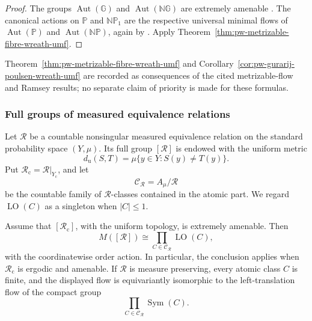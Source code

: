 \begin{proof}
The groups \(\operatorname{Aut}(\mathbb G)\) and
\(\operatorname{Aut}(\mathbb{NG})\) are extremely amenable
\cite{BartosovaLopezAbadLupiniMbombo2022,BartosovaLopezAbadLupiniMbombo2021}.  The canonical actions on \(\mathbb P\) and
\(\mathbb{NP}_1\) are the respective universal minimal flows of
\(\operatorname{Aut}(\mathbb P)\) and \(\operatorname{Aut}(\mathbb{NP})\),
again by \cite{BartosovaLopezAbadLupiniMbombo2022,BartosovaLopezAbadLupiniMbombo2021}.  Apply
Theorem~\ref{thm:pw-metrizable-fibre-wreath-umf}.
\end{proof}

Theorem~\ref{thm:pw-metrizable-fibre-wreath-umf} and
Corollary~\ref{cor:pw-gurarij-poulsen-wreath-umf} are recorded as consequences of
the cited metrizable-flow and Ramsey results; no separate claim of priority is
made for these formulas.


\subsubsection{Full groups of measured equivalence relations}

Let \(\mathcal R\) be a countable nonsingular measured equivalence relation on
the standard probability space \((Y,\mu)\). Its full group \([\mathcal R]\)
is endowed with the uniform metric
\[
 d_{\mathrm u}(S,T)=\mu\{y\in Y:S(y)\ne T(y)\}.
\]
Put \(\mathcal R_{\mathrm c}=\mathcal R|_{Y_{\mathrm c}}\), and let
\[
 \mathcal C_{\mathcal R}=A_\mu/\mathcal R
\]
be the countable family of \(\mathcal R\)-classes contained in the atomic
part. We regard \(\operatorname{LO}(C)\) as a singleton when \(|C|\leq1\).

\begin{theorem}\label{thm:pw-full-group-atomic-umf}
Assume that \([\mathcal R_{\mathrm c}]\), with the uniform topology, is
extremely amenable. Then
\[
 M([\mathcal R])
 \cong \prod_{C\in\mathcal C_{\mathcal R}}\operatorname{LO}(C),
\]
with the coordinatewise order action. In particular, the conclusion applies
when \(\mathcal R_{\mathrm c}\) is ergodic and amenable. If \(\mathcal R\) is
measure preserving, every atomic class \(C\) is finite, and the displayed flow
is equivariantly isomorphic to the left-translation flow of the compact group
\[
 \prod_{C\in\mathcal C_{\mathcal R}}\operatorname{Sym}(C).
\]
\end{theorem}


